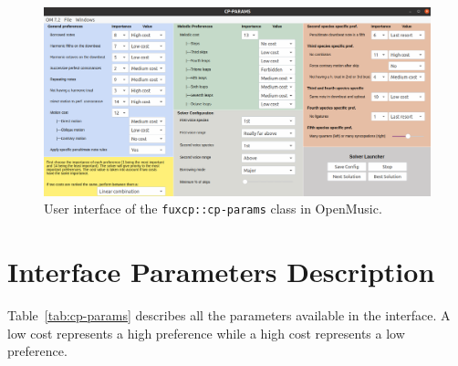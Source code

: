 \begin{figure}[!h]
    \includegraphics[width=1.4\textwidth, center]{Images/om_int_interface.png}
    \caption{User interface of the \texttt{fuxcp::cp-params} class in OpenMusic.}
    \label{fig:om_int_interface}
\end{figure}

\section{Interface Parameters Description} \label{appendix:interface-parameters-description}
Table~\ref{tab:cp-params} describes all the parameters available in the interface. A low cost represents a high preference while a high cost represents a low preference.

